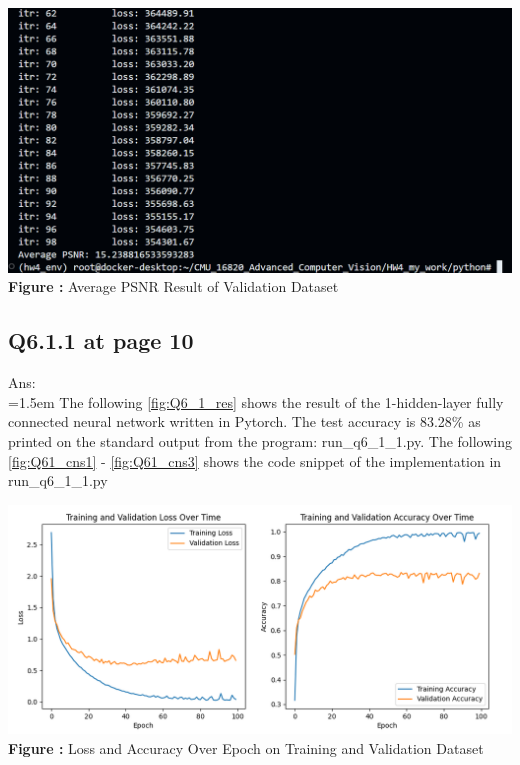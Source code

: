 \documentclass{article}
\begin{document}
\begin{minipage}{1\linewidth}
	\centering
	\hspace{0.12\linewidth} 
	\includegraphics[width=0.8\linewidth]{./Q54_res.png}  %
	\newline
	\textbf{Figure \thefigure:} Average PSNR Result of Validation Dataset %
	\label{fig:Q54_res}  %
\end{minipage}	

	\newpage	
	\subsection*{Q6.1.1 at page 10\texttt{}}
	Ans:\\
	\hangindent=1.5em \hspace{1.5em}The following \autoref{fig:Q6_1_res} shows the result of the 1-hidden-layer fully connected neural network written in Pytorch. The test accuracy is 83.28\% as printed on the standard output from the program: run\_q6\_1\_1.py. The following \autoref{fig:Q61_cns1} - \autoref{fig:Q61_cns3} shows the code snippet of the implementation in run\_q6\_1\_1.py
	\newline
	

\begin{minipage}{1\linewidth}
	\centering
	\hspace{0.12\linewidth} 
	\includegraphics[width=0.8\linewidth]{./Q6_1_res.png}  %
	\newline
	\textbf{Figure \thefigure:} Loss and Accuracy Over Epoch on Training and Validation Dataset %
	\label{fig:Q6_1_res}  %
\end{minipage}
\newline
\newline
\end{document}
